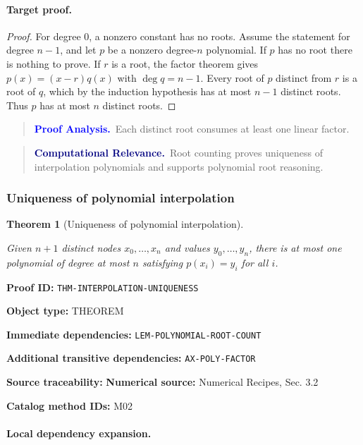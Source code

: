 \documentclass[10pt]{article}
\newcommand{\pidraw}[1]{\begingroup\urlstyle{tt}\nolinkurl{#1}\endgroup}
\newtheorem{theorem}{Theorem}[section]
\theoremstyle{definition}
\theoremstyle{remark}
\newenvironment{proofanalysis}
{\begin{quote}\small\noindent\textbf{\textcolor{blue}{Proof Analysis.}}\ }
{\end{quote}}
\newenvironment{computationalrelevance}
{\begin{quote}\small\noindent\textbf{\textcolor{navy}{Computational Relevance.}}\ }
{\end{quote}}
\newcommand{\meta}[2]{\noindent\textbf{#1:} #2\par}
\begin{document}
\paragraph{Target proof.}

\begin{proof}

For degree $0$, a nonzero constant has no roots. Assume the statement for degree
$n-1$, and let $p$ be a nonzero degree-$n$ polynomial. If $p$ has no root there is
nothing to prove. If $r$ is a root, the factor theorem gives
$p(x)=(x-r)q(x)$ with $\deg q=n-1$. Every root of $p$ distinct from $r$ is a
root of $q$, which by the induction hypothesis has at most $n-1$ distinct roots.
Thus $p$ has at most $n$ distinct roots.

\end{proof}

\begin{proofanalysis}Each distinct root consumes at least one linear factor.\end{proofanalysis}

\begin{computationalrelevance}Root counting proves uniqueness of interpolation polynomials and supports polynomial root reasoning.\end{computationalrelevance}

\subsubsection{Uniqueness of polynomial interpolation}

\begin{theorem}[Uniqueness of polynomial interpolation]\label{prf:THM-INTERPOLATION-UNIQUENESS}

Given $n+1$ distinct nodes $x_0,\ldots,x_n$ and values $y_0,\ldots,y_n$, there is at most one polynomial of degree at most $n$ satisfying $p(x_i)=y_i$ for all $i$.

\end{theorem}

\meta{Proof ID}{\pidraw{THM-INTERPOLATION-UNIQUENESS}}
\meta{Object type}{THEOREM}
\meta{Immediate dependencies}{\pidraw{LEM-POLYNOMIAL-ROOT-COUNT}}
\meta{Additional transitive dependencies}{\pidraw{AX-POLY-FACTOR}}
\meta{Source traceability}{\textbf{Numerical source:} Numerical Recipes, Sec. 3.2}
\meta{Catalog method IDs}{M02}

\paragraph{Local dependency expansion.}
\end{document}
